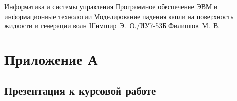 \documentclass{bmstu}
\begin{document}
\renewcommand{\thelstlisting}{\arabic{lstlisting}}

\makecourseworktitle
    {Информатика и системы управления}
    {Программное обеспечение ЭВМ и информационные технологии}
    {Моделирование падения капли на поверхность жидкости и генерации волн}
    {Шимшир~Э.~О./ИУ7-53Б}
    {Филиппов~М.~В.}
    {}

\maketableofcontents

 
 
 
 





\makebibliography

\chapter*{Приложение А}
\section*{Презентация к курсовой работе}
\end{document}
